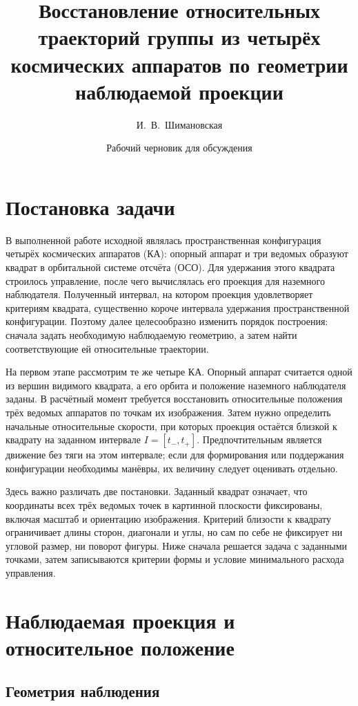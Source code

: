 \documentclass[a4paper,12pt]{article}
\title{Восстановление относительных траекторий группы из четырёх космических аппаратов по геометрии наблюдаемой проекции}
\author{И.~В.~Шимановская}
\date{Рабочий черновик для обсуждения}
\begin{document}
\justifying
\setlength{\parindent}{0.7cm}
\maketitle

\section{Постановка задачи}

В выполненной работе исходной являлась пространственная конфигурация четырёх космических аппаратов (КА): опорный аппарат и три ведомых образуют квадрат в орбитальной системе отсчёта (ОСО). Для удержания этого квадрата строилось управление, после чего вычислялась его проекция для наземного наблюдателя. Полученный интервал, на котором проекция удовлетворяет критериям квадрата, существенно короче интервала удержания пространственной конфигурации. Поэтому далее целесообразно изменить порядок построения: сначала задать необходимую наблюдаемую геометрию, а затем найти соответствующие ей относительные траектории.

На первом этапе рассмотрим те же четыре КА. Опорный аппарат считается одной из вершин видимого квадрата, а его орбита и положение наземного наблюдателя заданы. В расчётный момент требуется восстановить относительные положения трёх ведомых аппаратов по точкам их изображения. Затем нужно определить начальные относительные скорости, при которых проекция остаётся близкой к квадрату на заданном интервале $I=[t_-,t_+]$. Предпочтительным является движение без тяги на этом интервале; если для формирования или поддержания конфигурации необходимы манёвры, их величину следует оценивать отдельно.

Здесь важно различать две постановки. Заданный квадрат означает, что координаты всех трёх ведомых точек в картинной плоскости фиксированы, включая масштаб и ориентацию изображения. Критерий близости к квадрату ограничивает длины сторон, диагонали и углы, но сам по себе не фиксирует ни угловой размер, ни поворот фигуры. Ниже сначала решается задача с заданными точками, затем записываются критерии формы и условие минимального расхода управления.

\section{Наблюдаемая проекция и относительное положение}

\subsection{Геометрия наблюдения}
\end{document}
